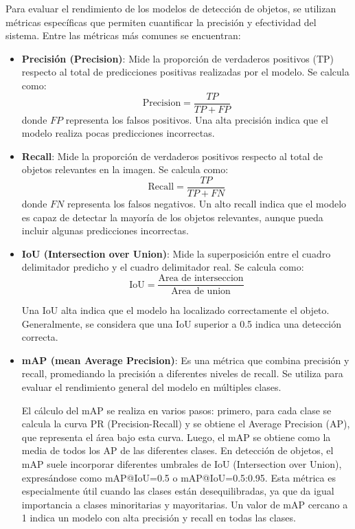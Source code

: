 \documentclass[11pt,spanish,listoffigures,listoftables]{tfgetsinf}
\begin{document}
Para evaluar el rendimiento de los modelos de detección de objetos, se utilizan métricas específicas que permiten cuantificar la precisión y efectividad del sistema. Entre las métricas más comunes se encuentran:

\begin{itemize}
   \item \textbf{Precisión (Precision)}: Mide la proporción de verdaderos positivos (TP) respecto al total de predicciones positivas realizadas por el modelo. Se calcula como:
   \[
   \text{Precision} = \frac{TP}{TP + FP}
   \]
   donde $FP$ representa los falsos positivos. Una alta precisión indica que el modelo realiza pocas predicciones incorrectas.

   \item \textbf{Recall}: Mide la proporción de verdaderos positivos respecto al total de objetos relevantes en la imagen. Se calcula como:
   \[
   \text{Recall} = \frac{TP}{TP + FN}
   \]
   donde $FN$ representa los falsos negativos. Un alto recall indica que el modelo es capaz de detectar la mayoría de los objetos relevantes, aunque pueda incluir algunas predicciones incorrectas.

   \item \textbf{IoU (Intersection over Union)}: Mide la superposición entre el cuadro delimitador predicho y el cuadro delimitador real. Se calcula como:
   \[
   \text{IoU} = \frac{\text{Area de interseccion}}{\text{Area de union}}
   \]

   Una IoU alta indica que el modelo ha localizado correctamente el objeto. Generalmente, se considera que una IoU superior a 0.5 indica una detección correcta.

   \item \textbf{mAP (mean Average Precision)}: Es una métrica que combina precisión y recall, promediando la precisión a diferentes niveles de recall. Se utiliza para evaluar el rendimiento general del modelo en múltiples clases. 
   
   El cálculo del mAP se realiza en varios pasos: primero, para cada clase se calcula la curva PR (Precision-Recall) y se obtiene el Average Precision (AP), que representa el área bajo esta curva. Luego, el mAP se obtiene como la media de todos los AP de las diferentes clases. En detección de objetos, el mAP suele incorporar diferentes umbrales de IoU (Intersection over Union), expresándose como mAP@IoU=0.5 o mAP@IoU=0.5:0.95. Esta métrica es especialmente útil cuando las clases están desequilibradas, ya que da igual importancia a clases minoritarias y mayoritarias. Un valor de mAP cercano a 1 indica un modelo con alta precisión y recall en todas las clases.


\end{itemize}
\end{document}

